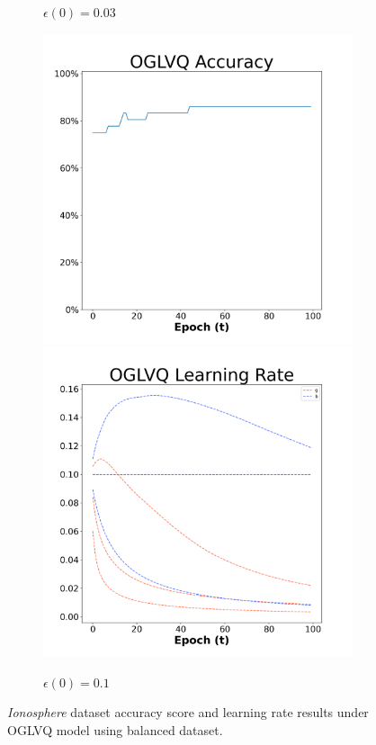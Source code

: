 \begin{figure}[H]
\begin{subfigure}{0.3\textwidth}
  \caption{$\epsilon(0)=0.03$}
\end{subfigure}\hfil %
\begin{subfigure}{0.3\textwidth}
  \includegraphics[width=\linewidth]{images/exper1/Ionosphere/OGLVQ_0.1_acc.png}
  \includegraphics[width=\linewidth]{images/exper1/Ionosphere/OGLVQ_0.1_lr.png}
  \caption{$\epsilon(0)=0.1$}
\end{subfigure}

\caption{\textit{Ionosphere} dataset accuracy score and learning rate results under OGLVQ model using balanced dataset.}\label{1ionglvq}
\end{figure}



